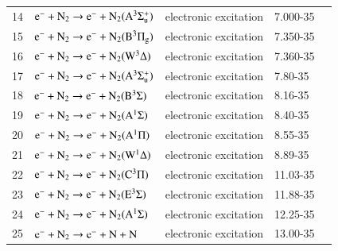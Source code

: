 \begin{table}
\begin{threeparttable}
\begin{tabular*}{\textwidth}{l@{\extracolsep{\fill}}llll}
      14 & $\rm e^- + N_2 \rightarrow e^- + N_2(A^3 \Sigma_{u}^+)$  &  electronic excitation   &  7.000-35 & \cite{lxc:2024:morgan}\\ 
      15 & $\rm e^- + N_2 \rightarrow e^- + N_2(B^3 \Pi_{g}) $  &  electronic excitation   &  7.350-35 & \cite{lxc:2024:morgan}\\ 
      16 & $\rm e^- + N_2 \rightarrow e^- + N_2(W^3 \Delta) $  &  electronic excitation   &  7.360-35 & \cite{lxc:2024:morgan}\\ 
      17 & $\rm e^- + N_2 \rightarrow e^- + N_2(A^3 \Sigma_{u}^+) $  &  electronic excitation   &  7.80-35 & \cite{lxc:2024:morgan}\\ 
      18 & $\rm e^- + N_2 \rightarrow e^- + N_2(B^3 \Sigma) $  &  electronic excitation   &  8.16-35 & \cite{lxc:2024:morgan}\\ 
      19 & $\rm e^- + N_2 \rightarrow e^- + N_2(A^1 \Sigma) $  &  electronic excitation   &  8.40-35 & \cite{lxc:2024:morgan}\\ 
      20 & $\rm e^- + N_2 \rightarrow e^- + N_2(A^1 \Pi) $  &  electronic excitation   &  8.55-35 & \cite{lxc:2024:morgan}\\ 
      21 & $\rm e^- + N_2 \rightarrow e^- + N_2(W^1 \Delta) $  &  electronic excitation   &  8.89-35 & \cite{lxc:2024:morgan}\\ 
      22 & $\rm e^- + N_2 \rightarrow e^- + N_2(C^3 \Pi) $  &  electronic excitation   &  11.03-35 & \cite{lxc:2024:morgan}\\ 
      23 & $\rm e^- + N_2 \rightarrow e^- + N_2(E^3 \Sigma) $  &  electronic excitation   &  11.88-35 & \cite{lxc:2024:morgan}\\  
      24 & $\rm e^- + N_2 \rightarrow e^- + N_2(A^1 \Sigma) $  &  electronic excitation   &  12.25-35 & \cite{lxc:2024:morgan}\\ 
      25 & $\rm e^- + N_2 \rightarrow e^- + N + N $  &  electronic excitation   &  13.00-35 & \cite{lxc:2024:morgan}\\ 
    \bottomrule
    \end{tabular*}
   \end{threeparttable}
\end{table}

